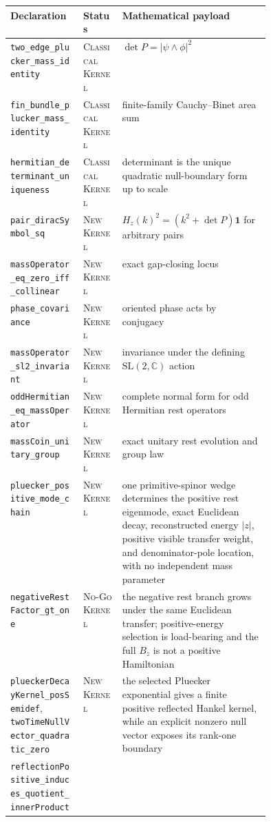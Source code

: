 \documentclass[11pt]{article}
\newcommand{\Kernel}{\textcolor{kernelcolor}{\textsc{Kernel}}}
\newcommand{\Classical}{\textcolor{classicalcolor}{\textsc{Classical}}}
\newcommand{\NewResult}{\textsc{New}}
\newcommand{\NoGo}{\textsc{No-Go}}
\newcommand{\C}{\mathbb{C}}
\newcommand{\id}{\mathbf{1}}
\begin{document}
\begin{center}
\small
\begin{tabularx}{\linewidth}{@{}p{0.29\linewidth}p{0.15\linewidth}X@{}}
\toprule
Declaration & Status & Mathematical payload\\
\midrule
\texttt{two\_edge\_plucker\_mass\_identity}
 & \Classical{} \Kernel{} & $\det P=|\psi\wedge\phi|^2$\\
\texttt{fin\_bundle\_plucker\_mass\_identity}
 & \Classical{} \Kernel{} & finite-family Cauchy--Binet area sum\\
\texttt{hermitian\_determinant\_uniqueness}
 & \Classical{} \Kernel{} & determinant is the unique quadratic null-boundary form up to scale\\
\texttt{pair\_diracSymbol\_sq}
 & \NewResult{} \Kernel{} & $H_z(k)^2=(k^2+\det P)\id$ for arbitrary pairs\\
\texttt{massOperator\_eq\_zero\_iff\_collinear}
 & \NewResult{} \Kernel{} & exact gap-closing locus\\
\texttt{phase\_covariance}
 & \NewResult{} \Kernel{} & oriented phase acts by conjugacy\\
\texttt{massOperator\_sl2\_invariant}
 & \NewResult{} \Kernel{} & invariance under the defining $\mathrm{SL}(2,\C)$ action\\
\texttt{oddHermitian\_eq\_massOperator}
 & \NewResult{} \Kernel{} & complete normal form for odd Hermitian rest operators\\
\texttt{massCoin\_unitary\_group}
 & \NewResult{} \Kernel{} & exact unitary rest evolution and group law\\
\texttt{pluecker\_positive\_mode\_chain}
 & \NewResult{} \Kernel{} & one primitive-spinor wedge determines the positive rest eigenmode, exact Euclidean decay, reconstructed energy $|z|$, positive visible transfer weight, and denominator-pole location, with no independent mass parameter\\
\texttt{negativeRestFactor\_gt\_one}
 & \NoGo{} \Kernel{} & the negative rest branch grows under the same Euclidean transfer; positive-energy selection is load-bearing and the full $B_z$ is not a positive Hamiltonian\\
\texttt{plueckerDecayKernel\_posSemidef},
\texttt{twoTimeNullVector\_quadratic\_zero}
 & \NewResult{} \Kernel{} & the selected Pluecker exponential gives a finite positive reflected Hankel kernel, while an explicit nonzero null vector exposes its rank-one boundary\\
\texttt{reflectionPositive\_induces\_quotient\_innerProduct}

\end{tabularx}
\end{center}
\end{document}
